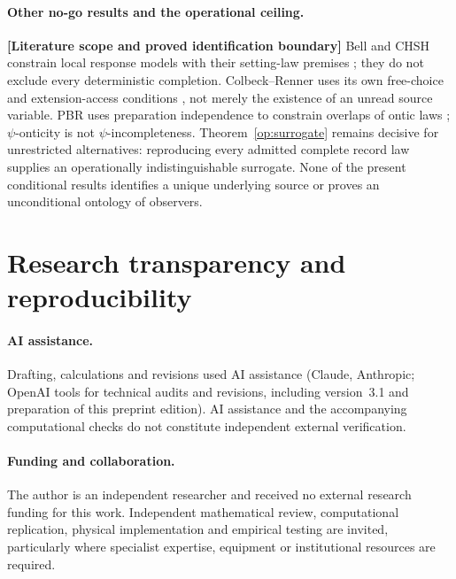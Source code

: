 \documentclass[11pt,a4paper]{article}
\theoremstyle{definition}
\theoremstyle{remark}\newtheorem{remark}[theorem]{Remark}
\newcommand{\status}[1]{\textbf{[#1]}\quad}
\begin{document}
\paragraph{Other no-go results and the operational ceiling.}
\status{Literature scope and proved identification boundary}
Bell and CHSH constrain local response models with their setting-law premises \cite{Bell64,CHSH69}; they do not exclude every deterministic completion. Colbeck--Renner uses its own free-choice and extension-access conditions \cite{CR11}, not merely the existence of an unread source variable. PBR uses preparation independence to constrain overlaps of ontic laws \cite{PBR12}; $\psi$-onticity is not $\psi$-incompleteness. Theorem~\ref{op:surrogate} remains decisive for unrestricted alternatives: reproducing every admitted complete record law supplies an operationally indistinguishable surrogate. None of the present conditional results identifies a unique underlying source or proves an unconditional ontology of observers.

\clearpage\section*{Research transparency and reproducibility}
\paragraph{AI assistance.}
Drafting, calculations and revisions used AI assistance (Claude, Anthropic; OpenAI tools for technical audits and revisions, including version~3.1 and preparation of this preprint edition). AI assistance and the accompanying computational checks do not constitute independent external verification.
\paragraph{Funding and collaboration.}
The author is an independent researcher and received no external research funding for this work. Independent mathematical review, computational replication, physical implementation and empirical testing are invited, particularly where specialist expertise, equipment or institutional resources are required.
\end{document}
